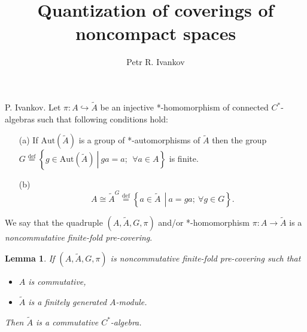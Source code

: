 \documentclass{beamer}
\title{Quantization of coverings of noncompact spaces}
\institute
{
Noncommutative geometry and topology
}
\author{Petr R. Ivankov  }
\theoremstyle{plain}
\newtheorem{lem}{Lemma}%
\newcommand{\be}{\begin{equation}}
\newcommand{\ee}{\end{equation}}
\newcommand{\Aut}{\mathrm{Aut}}
\newcommand{\bydef}{\stackrel{\mathrm{def}}{=}}
\newcommand{\hookto}{\hookrightarrow}        %
\begin{document}
\begin{frame}
  \titlepage
\end{frame}
\begin{frame}
	   \begin{definition}\label{pre_defn} \alert{P. Ivankov}.
		Let $\pi: A \hookto \widetilde{A}$ be an injective *-homomorphism of connected  $C^*$-algebras such that following conditions hold:
		\begin{enumerate}
			\item[(a)] If $\Aut\left(\widetilde{A} \right)$ is a group of *-automorphisms of $\widetilde{A}$ then the group  
			$
			G \bydef \left\{ \left.g \in \Aut\left(\widetilde{A} \right)~\right|~ ga = a;~~\forall a \in A\right\}
			$
			is finite.
			\item[(b)] 	\be\label{cond_b_eqn}
			A \cong \widetilde{A}^G\stackrel{\text{def}}{=}\left\{\left.a\in \widetilde{A}~~\right|~ a = g a;~ \forall g \in G\right\}.\ee
		\end{enumerate}
		We say that the quadruple $\left(A, \widetilde{A}, G, \pi \right)$ and/or *-homomorphism $\pi: A \to \widetilde{A}$   is a \textit{noncommutative finite-fold  pre-covering}. 
	\end{definition}
\begin{lem}
If $\left(A, \widetilde{A}, G, \pi \right)$ is noncommutative finite-fold  pre-covering such that
\begin{itemize}
	\item $A$ is commutative,
	\item $\widetilde{A}$ is a finitely generated $A$-module.
\end{itemize}
Then $\widetilde{A}$ is a commutative $C^*$-algebra.
\end{lem}
\end{frame}
\end{document}

